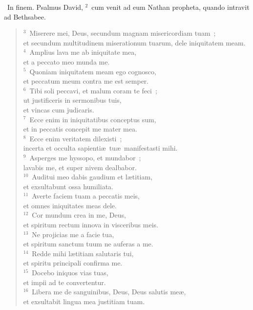 ~\lettrine[lines=10,image=true,loversize=0.05,lraise=-0.03]{I}{}n finem. Psalmus David,
${}^{2}$~cum venit ad eum Nathan propheta, quando intravit ad Bethsabee.
\begin{flushleft}\begin{verse}${}^{3}$~Miserere mei, Deus, secundum magnam misericordiam tuam~;\\ et secundum multitudinem miserationum tuarum, dele iniquitatem meam.\\
${}^{4}$~Amplius lava me ab iniquitate mea,\\ et a peccato meo munda me.\\
${}^{5}$~Quoniam iniquitatem meam ego cognosco,\\ et peccatum meum contra me est semper.\\
${}^{6}$~Tibi soli peccavi, et malum coram te feci~;\\ ut justificeris in sermonibus tuis,\\ et vincas cum judicaris.\\
${}^{7}$~Ecce enim in iniquitatibus conceptus sum,\\ et in peccatis concepit me mater mea.\\
${}^{8}$~Ecce enim veritatem dilexisti~;\\ incerta et occulta sapienti\ae\ tu\ae\ manifestasti mihi.\\
${}^{9}$~Asperges me hyssopo, et mundabor~;\\ lavabis me, et super nivem dealbabor.\\
${}^{10}$~Auditui meo dabis gaudium et l\ae titiam,\\ et exsultabunt ossa humiliata.\\
${}^{11}$~Averte faciem tuam a peccatis meis,\\ et omnes iniquitates meas dele.\\
${}^{12}$~Cor mundum crea in me, Deus,\\ et spiritum rectum innova in visceribus meis.\\
${}^{13}$~Ne projicias me a facie tua,\\ et spiritum sanctum tuum ne auferas a me.\\
${}^{14}$~Redde mihi l\ae titiam salutaris tui,\\ et spiritu principali confirma me.\\
${}^{15}$~Docebo iniquos vias tuas,\\ et impii ad te convertentur.\\
${}^{16}$~Libera me de sanguinibus, Deus, Deus salutis me\ae ,\\ et exsultabit lingua mea justitiam tuam.\\

\end{verse}
\end{flushleft}

